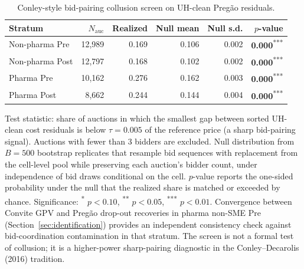 \begin{table}[!htbp]
\centering
\begin{threeparttable}
\caption{Conley-style bid-pairing collusion screen on UH-clean Preg\~ao residuals.}
\label{tab:collusion_screen}
\small
\setlength{\tabcolsep}{6pt}
\providecommand{\sym}[1]{\textsuperscript{#1}}
\begin{tabular}{lrrrrr}
\toprule
Stratum & $N_{\mathrm{auc}}$ & Realized & Null mean & Null s.d. & $p$-value \\
\midrule
Non-pharma Pre & 12,989 & 0.169 & 0.106 & 0.002 & \textbf{0.000}\sym{***} \\
Non-pharma Post & 12,797 & 0.168 & 0.102 & 0.002 & \textbf{0.000}\sym{***} \\
Pharma Pre & 10,162 & 0.276 & 0.162 & 0.003 & \textbf{0.000}\sym{***} \\
Pharma Post & 8,662 & 0.244 & 0.144 & 0.004 & \textbf{0.000}\sym{***} \\
\bottomrule
\end{tabular}
\begin{tablenotes}[flushleft]\footnotesize
\item Test statistic: share of auctions in which the smallest gap between sorted UH-clean cost residuals is below $\tau = 0.005$ of the reference price (a sharp bid-pairing signal). Auctions with fewer than 3 bidders are excluded. Null distribution from $B = 500$ bootstrap replicates that resample bid sequences with replacement from the cell-level pool while preserving each auction's bidder count, under independence of bid draws conditional on the cell. $p$-value reports the one-sided probability under the null that the realized share is matched or exceeded by chance. Significance: \sym{*} $p<0.10$, \sym{**} $p<0.05$, \sym{***} $p<0.01$. Convergence between Convite GPV and Preg\~ao drop-out recoveries in pharma non-SME Pre (Section~\ref{sec:identification}) provides an independent consistency check against bid-coordination contamination in that stratum. The screen is not a formal test of collusion; it is a higher-power sharp-pairing diagnostic in the Conley--Decarolis (2016) tradition.
\end{tablenotes}
\end{threeparttable}
\end{table}
